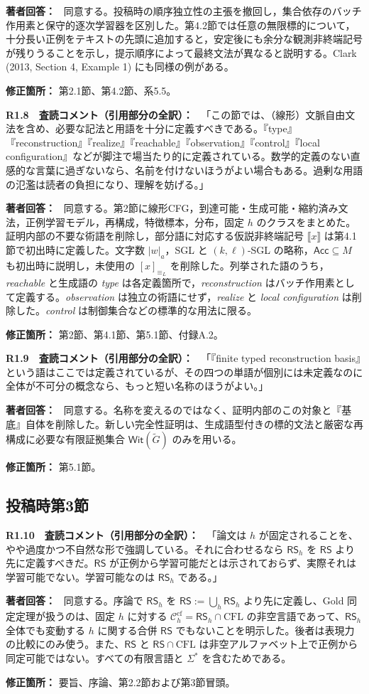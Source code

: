 \documentclass[10pt,a4paper]{ltjsarticle}
\newcommand{\NT}[1]{\llbracket #1\rrbracket}
\newcommand{\Comment}[1]{\par\medskip\noindent\textbf{#1　査読コメント（引用部分の全訳）：}\ }
\newcommand{\Reply}{\par\noindent\textbf{著者回答：}\ }
\newcommand{\Location}[1]{\par\noindent\textbf{修正箇所：} #1\par}
\newcommand{\Chcf}{\mathcal C_h^{\mathrm{cf}}}
\newcommand{\RSh}{\mathsf{RS}_h}
\newcommand{\RS}{\mathsf{RS}}
\begin{document}
\Reply
同意する。投稿時の順序独立性の主張を撤回し，集合依存のバッチ作用素と保守的逐次学習器を区別した。第4.2節では任意の無限標的について，十分長い正例をテキストの先頭に追加すると，安定後にも余分な観測非終端記号が残りうることを示し，提示順序によって最終文法が異なると説明する。Clark (2013, Section 4, Example 1) にも同様の例がある。
\Location{第2.1節、第4.2節、系5.5。}

\Comment{R1.8}
「この節では、（線形）文脈自由文法を含め、必要な記法と用語を十分に定義すべきである。『type』『reconstruction』『realize』『reachable』『observation』『control』『local configuration』などが脚注で場当たり的に定義されている。数学的定義のない直感的な言葉に過ぎないなら、名前を付けないほうがよい場合もある。過剰な用語の氾濫は読者の負担になり、理解を妨げる。」

\Reply
同意する。第2節に線形CFG，到達可能・生成可能・縮約済み文法，正例学習モデル，再構成，特徴標本，分布，固定 $h$ のクラスをまとめた。証明内部の不要な術語を削除し，部分語に対応する仮説非終端記号 $\NT{x}$ は第4.1節で初出時に定義した。文字数 $|w|_a$，SGL と $(k,\ell)$-SGL の略称，$\mathsf{Acc}\subseteq M$ も初出時に説明し，未使用の $[x]_{\equiv_L}$ を削除した。列挙された語のうち，\emph{reachable} と生成語の \emph{type} は各定義箇所で，\emph{reconstruction} はバッチ作用素として定義する。\emph{observation} は独立の術語にせず，\emph{realize} と \emph{local configuration} は削除した。\emph{control} は制御集合などの標準的な用法に限る。
\Location{第2節、第4.1節、第5.1節、付録A.2。}

\Comment{R1.9}
「『finite typed reconstruction basis』という語はここでは定義されているが、その四つの単語が個別には未定義なのに全体が不可分の概念なら、もっと短い名称のほうがよい。」

\Reply
同意する。名称を変えるのではなく、証明内部のこの対象と『基底』自体を削除した。新しい完全性証明は、生成語型付きの標的文法と厳密な再構成に必要な有限証拠集合 $\mathsf{Wit}(\widetilde G)$ のみを用いる。
\Location{第5.1節。}

\subsection*{投稿時第3節}
\Comment{R1.10}
「論文は $h$ が固定されることを、やや過度かつ不自然な形で強調している。それに合わせるなら $\mathsf{RS}_h$ を $\mathsf{RS}$ より先に定義すべきだ。$\mathsf{RS}$ が正例から学習可能だとは示されておらず、実際それは学習可能でない。学習可能なのは $\mathsf{RS}_h$ である。」

\Reply
同意する。序論で $\RSh$ を $\RS:=\bigcup_h\RSh$ より先に定義し、Gold 同定定理が扱うのは、固定 $h$ に対する $\Chcf=\RSh\cap\mathrm{CFL}$ の非空言語であって、$\RSh$ 全体でも変動する $h$ に関する合併 $\RS$ でもないことを明示した。後者は表現力の比較にのみ使う。また、$\RS$ と $\RS\cap\mathrm{CFL}$ は非空アルファベット上で正例から同定可能ではない。すべての有限言語と $\Sigma^*$ を含むためである。
\Location{要旨、序論、第2.2節および第3節冒頭。}
\end{document}
